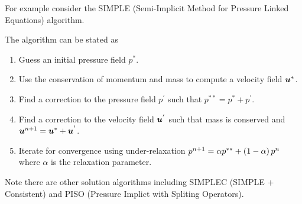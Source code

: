 For example consider the SIMPLE (Semi-Implicit Method for Pressure Linked
Equations) algorithm.

The algorithm can be stated as
\begin{enumerate}
\item Guess an initial pressure field $p^{*}$.
\item Use the conservation of momentum and mass to compute a velocity field
  $\boldsymbol{u}^{*}$.
\item Find a correction to the pressure field $p^{'}$ such that
  $p^{**}=p^{*}+p^{'}$.
\item Find a correction to the velocity field $\boldsymbol{u}^{'}$ such that mass
  is conserved and 
  $\boldsymbol{u}^{n+1}=\boldsymbol{u}^{*}+\boldsymbol{u}^{'}$.
\item Iterate for convergence using under-relaxation \ie $p^{n+1}=\alpha
  p^{**}+\left( 1-\alpha \right) p^{n}$ where $\alpha$ is the relaxation parameter.
\end{enumerate}

Note there are other solution algorithms including SIMPLEC (SIMPLE +
Consistent) and PISO (Pressure Implict with Spliting Operators).

